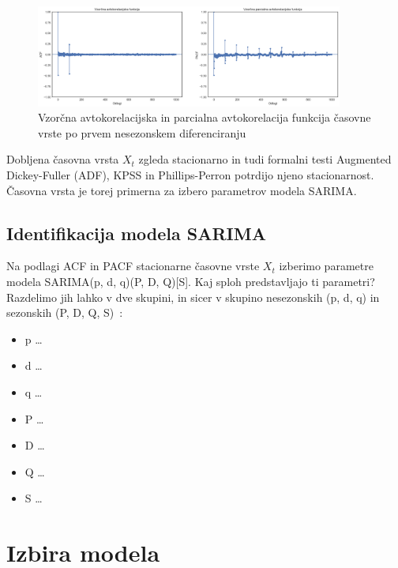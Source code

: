 \documentclass[a4paper, 11pt]{article}
\begin{document}
\begin{figure}[h!]
    \centering
    \caption{Vzorčna avtokorelacijska in parcialna avtokorelacija funkcija časovne vrste po prvem nesezonskem diferenciranju}\par\medskip
    \label{fig:ts_diff_2_acf_pacf}
    \includegraphics[width=0.9\textwidth]{ts_diff_2_acf_pacf.png}
\end{figure}

\noindent Dobljena časovna vrsta $X_t$ zgleda stacionarno in tudi formalni testi Augmented Dickey-Fuller (ADF), 
KPSS in Phillips-Perron potrdijo njeno stacionarnost. Časovna vrsta je torej primerna za izbero parametrov modela
SARIMA. 

\subsection{Identifikacija modela SARIMA}

\noindent Na podlagi ACF in PACF stacionarne časovne vrste $X_t$ izberimo parametre 
modela SARIMA(p, d, q)(P, D, Q)[S]. Kaj sploh predstavljajo ti parametri? Razdelimo jih lahko v dve skupini,
in sicer v skupino nesezonskih (p, d, q) in sezonskih (P, D, Q, S)~\cite{SARIMA_param}:

\begin{itemize}
    \item p \dots
    \item d \dots
    \item q \dots
    \item P \dots
    \item D \dots
    \item Q \dots
    \item S \dots
\end{itemize}





\section{Izbira modela}
\end{document}
